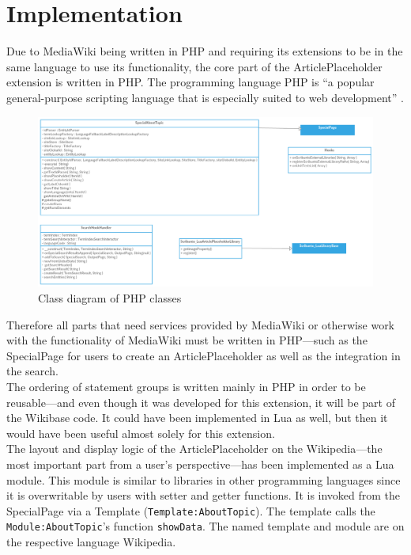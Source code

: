 \chapter{Implementation}
	
	Due to MediaWiki being written in PHP and requiring its extensions to be in the same language to use its functionality, the core part of the ArticlePlaceholder extension is written in PHP. The programming language PHP is ``a popular general-purpose scripting language that is especially suited to web development'' \citep{php:01}. \\
	\begin{figure}[H]
		\centering
		\includegraphics[width=\textwidth]{diagrams/ArticlePlaceholderClassDiagram.png}
		\caption{Class diagram of PHP classes}
		\label{fig:ClassDiagramPHP}
	\end{figure}
	Therefore all parts that need services provided by MediaWiki or otherwise work with the functionality of MediaWiki must be written in PHP---such as the SpecialPage for users to create an ArticlePlaceholder as well as the integration in the search. \\
	The ordering of statement groups is written mainly in PHP in order to be reusable---and even though it was developed for this extension, it will be part of the Wikibase code. It could have been implemented in Lua as well, but then it would have been useful almost solely for this extension. \\
	The layout and display logic of the ArticlePlaceholder on the Wikipedia---the most important part from a user's perspective---has been implemented as a Lua module. This module is similar to libraries in other programming languages since it is overwritable by users with setter and getter functions. It is invoked from the SpecialPage via a Template (\texttt{\justify Template:AboutTopic}). The template calls the \texttt{\justify Module:AboutTopic}'s function \texttt{\justify showData}. The named template and module are on the respective language Wikipedia. \\
	
	
	
	
	
	
	
	
	
	